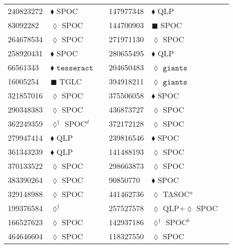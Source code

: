 \begin{longtable}{llrllr}
240823272 & $\blacklozenge$ SPOC & \cite{TIC_70524163} & 147977348 & $\blacklozenge$ QLP & \cite{TIC_409794137} \\
83092282 & $\lozenge$ SPOC & \cite{TIC_83092282} & 144700903 & $\blacksquare$ SPOC & \cite{TIC_144700903} \\
264678534 & $\lozenge$ SPOC & \cite{TIC_264678534} & 271971130 & $\lozenge$ SPOC & \cite{TIC_271971130} \\
258920431 & $\blacklozenge$ SPOC & \cite{TIC_70524163} & 280655495 & $\blacklozenge$ QLP & \cite{TIC_156648452} \\
66561343 & $\blacklozenge$ $\texttt{tesseract}$ & \cite{TIC_66561343} & 204650483 & $\lozenge$ $\texttt{giants}$ & \cite{TIC_394918211} \\
16005254 & $\blacksquare$ TGLC & \cite{TIC_16005254} & 394918211 & $\lozenge$ $\texttt{giants}$ & \cite{TIC_394918211} \\
321857016 & $\lozenge$ SPOC & \cite{TIC_321857016} & 375506058 & $\blacklozenge$ SPOC & \cite{TIC_375506058} \\
290348383 & $\lozenge$ SPOC & \cite{TIC_290348383} & 436873727 & $\lozenge$ SPOC & \cite{TIC_436873727} \\
362249359 & $\lozenge^\dagger$ SPOC$^d$ & \cite{TIC_10837041} & 372172128 & $\lozenge$ SPOC & \cite{TIC_372172128} \\
279947414 & $\blacklozenge$ QLP & \cite{TIC_156648452} & 239816546 &$\blacklozenge$ SPOC & \cite{TIC_70524163} \\
361343239 & $\blacklozenge$ QLP & \cite{TIC_156648452} & 141488193 & $\lozenge$ SPOC & \cite{TIC_141488193} \\
370133522 & $\lozenge$ SPOC & \cite{TIC_103633434} & 298663873 & $\lozenge$ SPOC & \cite{TIC_298663873} \\
383390264 & $\lozenge$ SPOC & \cite{TIC_383390264} & 90850770 & $\blacklozenge$ SPOC & \cite{TIC_70524163} \\
329148988 & $\lozenge$ SPOC & \cite{TIC_329148988} & 441462736 & $\lozenge$ TASOC$^a$ & \cite{TIC_441462736} \\
199376584 & $\lozenge^\dagger$ & \cite{TIC_199376584} & 257527578 & $\lozenge$ QLP+$\lozenge$ SPOC & \cite{TIC_124029677} \\
166527623 & $\lozenge$ SPOC & \cite{TIC_166527623} & 142937186 & $\lozenge^\dagger$ SPOC$^b$ & \cite{TIC_10837041} \\
464646604 & $\lozenge$ SPOC & \cite{TIC_464646604} & 118327550 & $\lozenge$ SPOC & \cite{TIC_118327550} \\

\end{longtable}
